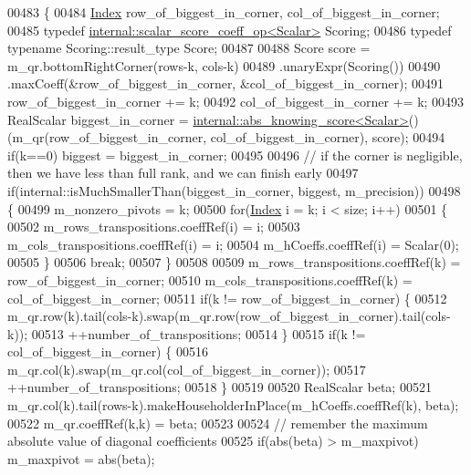 \begin{DoxyCode}
00483   \{
00484     \hyperlink{namespace_eigen_a62e77e0933482dafde8fe197d9a2cfde}{Index} row\_of\_biggest\_in\_corner, col\_of\_biggest\_in\_corner;
00485     \textcolor{keyword}{typedef} \hyperlink{struct_eigen_1_1internal_1_1scalar__score__coeff__op}{internal::scalar\_score\_coeff\_op<Scalar>} Scoring;
00486     \textcolor{keyword}{typedef} \textcolor{keyword}{typename} Scoring::result\_type Score;
00487 
00488     Score score = m\_qr.bottomRightCorner(rows-k, cols-k)
00489                       .unaryExpr(Scoring())
00490                       .maxCoeff(&row\_of\_biggest\_in\_corner, &col\_of\_biggest\_in\_corner);
00491     row\_of\_biggest\_in\_corner += k;
00492     col\_of\_biggest\_in\_corner += k;
00493     RealScalar biggest\_in\_corner = \hyperlink{struct_eigen_1_1internal_1_1abs__knowing__score}{internal::abs\_knowing\_score<Scalar>}()
      (m\_qr(row\_of\_biggest\_in\_corner, col\_of\_biggest\_in\_corner), score);
00494     \textcolor{keywordflow}{if}(k==0) biggest = biggest\_in\_corner;
00495 
00496     \textcolor{comment}{// if the corner is negligible, then we have less than full rank, and we can finish early}
00497     \textcolor{keywordflow}{if}(internal::isMuchSmallerThan(biggest\_in\_corner, biggest, m\_precision))
00498     \{
00499       m\_nonzero\_pivots = k;
00500       \textcolor{keywordflow}{for}(\hyperlink{namespace_eigen_a62e77e0933482dafde8fe197d9a2cfde}{Index} i = k; i < size; i++)
00501       \{
00502         m\_rows\_transpositions.coeffRef(i) = i;
00503         m\_cols\_transpositions.coeffRef(i) = i;
00504         m\_hCoeffs.coeffRef(i) = Scalar(0);
00505       \}
00506       \textcolor{keywordflow}{break};
00507     \}
00508 
00509     m\_rows\_transpositions.coeffRef(k) = row\_of\_biggest\_in\_corner;
00510     m\_cols\_transpositions.coeffRef(k) = col\_of\_biggest\_in\_corner;
00511     \textcolor{keywordflow}{if}(k != row\_of\_biggest\_in\_corner) \{
00512       m\_qr.row(k).tail(cols-k).swap(m\_qr.row(row\_of\_biggest\_in\_corner).tail(cols-k));
00513       ++number\_of\_transpositions;
00514     \}
00515     \textcolor{keywordflow}{if}(k != col\_of\_biggest\_in\_corner) \{
00516       m\_qr.col(k).swap(m\_qr.col(col\_of\_biggest\_in\_corner));
00517       ++number\_of\_transpositions;
00518     \}
00519 
00520     RealScalar beta;
00521     m\_qr.col(k).tail(rows-k).makeHouseholderInPlace(m\_hCoeffs.coeffRef(k), beta);
00522     m\_qr.coeffRef(k,k) = beta;
00523 
00524     \textcolor{comment}{// remember the maximum absolute value of diagonal coefficients}
00525     \textcolor{keywordflow}{if}(abs(beta) > m\_maxpivot) m\_maxpivot = abs(beta);

\end{DoxyCode}
